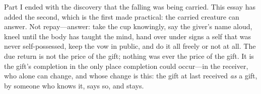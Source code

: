 Part I ended with the discovery that the falling was being carried. This essay has added the second, which is the first made practical: the carried creature can answer. Not repay---answer: take the cup knowingly, say the giver's name aloud, kneel until the body has taught the mind, hand over under signs a self that was never self-possessed, keep the vow in public, and do it all freely or not at all. The due return is not the price of the gift; nothing was ever the price of the gift. It is the gift's completion in the only place completion could occur---in the receiver, who alone can change, and whose change is this: the gift at last received \emph{as} a gift, by someone who knows it, says so, and stays.
